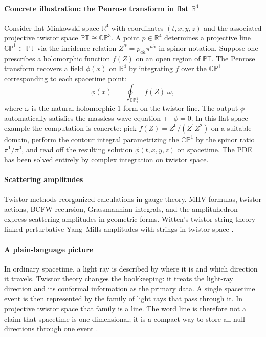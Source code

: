 \paragraph{Concrete illustration: the Penrose transform in flat $\mathbb{R}^4$}
Consider flat Minkowski space $\mathbb{R}^4$ with coordinates $(t,x,y,z)$ and the associated projective twistor space $\mathbb{PT}\cong\mathbb{CP}^3$. A point $p\in\mathbb{R}^4$ determines a projective line $\mathbb{CP}^1\subset\mathbb{PT}$ via the incidence relation $Z^\alpha=p_{a\dot{a}}\pi^{a\dot{\alpha}}$ in spinor notation. Suppose one prescribes a holomorphic function $f(Z)$ on an open region of $\mathbb{PT}$. The Penrose transform recovers a field $\phi(x)$ on $\mathbb{R}^4$ by integrating $f$ over the $\mathbb{CP}^1$ corresponding to each spacetime point:
\[
\phi(x)\;=\;\oint_{\mathbb{CP}^1_x} f(Z)\;\omega,
\]
where $\omega$ is the natural holomorphic $1$-form on the twistor line. The output $\phi$ automatically satisfies the massless wave equation $\Box\,\phi=0$. In this flat-space example the computation is concrete: pick $f(Z)=Z^0/(Z^1 Z^2)$ on a suitable domain, perform the contour integral parametrizing the $\mathbb{CP}^1$ by the spinor ratio $\pi^1/\pi^0$, and read off the resulting solution $\phi(t,x,y,z)$ on spacetime. The PDE has been solved entirely by complex integration on twistor space.

\paragraph{Scattering amplitudes}
Twistor methods reorganized calculations in gauge theory. MHV formulas, twistor actions, BCFW recursion, Grassmannian integrals, and the amplituhedron express scattering amplitudes in geometric forms. Witten's twistor string theory linked perturbative Yang--Mills amplitudes with strings in twistor space \cite{twistor_ref4}.

\paragraph{A plain-language picture}
In ordinary spacetime, a light ray is described by where it is and which
direction it travels. Twistor theory changes the bookkeeping: it treats the
light-ray direction and its conformal information as the primary data. A
single spacetime event is then represented by the family of light rays that
pass through it. In projective twistor space that family is a line. The word
line is therefore not a claim that spacetime is one-dimensional; it is a
compact way to store all null directions through one event \cite{twistor_ref1,twistor_ref2}.

